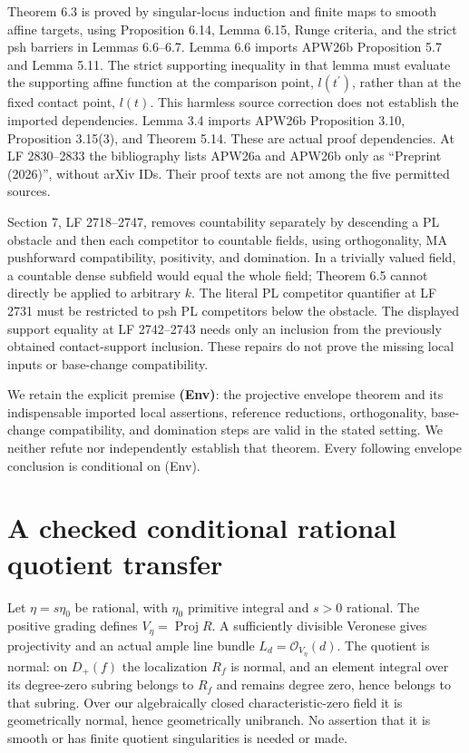\documentclass[11pt]{article}
\begin{document}
Theorem 6.3 is proved by singular-locus induction and finite maps to smooth affine targets, using Proposition 6.14, Lemma 6.15, Runge criteria, and the strict psh barriers in Lemmas 6.6--6.7.
Lemma 6.6 imports APW26b Proposition 5.7 and Lemma 5.11.
The strict supporting inequality in that lemma must evaluate the supporting affine function at the comparison point, $l(t^{\prime})$, rather than at the fixed contact point, $l(t)$. This harmless source correction does not establish the imported dependencies.
Lemma 3.4 imports APW26b Proposition 3.10, Proposition 3.15(3), and Theorem 5.14.
These are actual proof dependencies.
At LF 2830--2833 the bibliography lists APW26a and APW26b only as ``Preprint (2026)'', without arXiv IDs.
Their proof texts are not among the five permitted sources.

Section 7, LF 2718--2747, removes countability separately by descending a PL obstacle and then each competitor to countable fields, using orthogonality, MA pushforward compatibility, positivity, and domination.
In a trivially valued field, a countable dense subfield would equal the whole field; Theorem 6.5 cannot directly be applied to arbitrary $k$.
The literal PL competitor quantifier at LF 2731 must be restricted to psh PL competitors below the obstacle.
The displayed support equality at LF 2742--2743 needs only an inclusion from the previously obtained contact-support inclusion.
These repairs do not prove the missing local inputs or base-change compatibility.

We retain the explicit premise \textbf{(Env)}: the projective envelope theorem and its indispensable imported local assertions, reference reductions, orthogonality, base-change compatibility, and domination steps are valid in the stated setting.
We neither refute nor independently establish that theorem.
Every following envelope conclusion is conditional on (Env).

\section{A checked conditional rational quotient transfer}
Let $\eta=s\eta_0$ be rational, with $\eta_0$ primitive integral and $s>0$ rational.
The positive grading defines $V_\eta=\operatorname{Proj}R$.
A sufficiently divisible Veronese gives projectivity and an actual ample line bundle $L_d=\mathcal O_{V_\eta}(d)$.
The quotient is normal: on $D_+(f)$ the localization $R_f$ is normal, and an element integral over its degree-zero subring belongs to $R_f$ and remains degree zero, hence belongs to that subring.
Over our algebraically closed characteristic-zero field it is geometrically normal, hence geometrically unibranch.
No assertion that it is smooth or has finite quotient singularities is needed or made.
\end{document}
